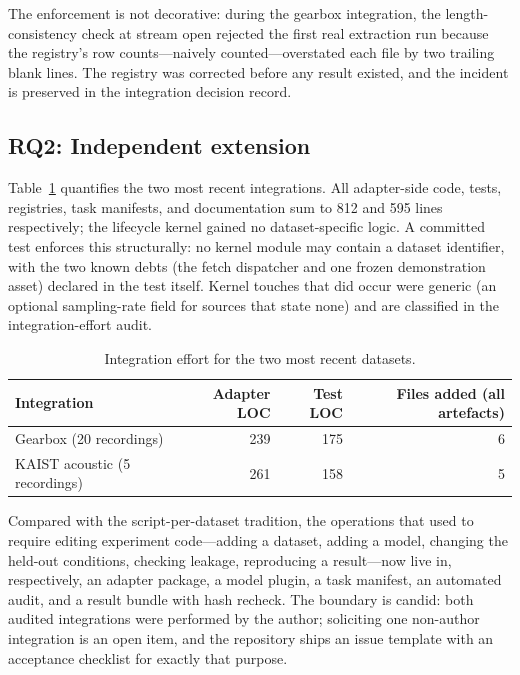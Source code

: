 The enforcement is not decorative: during the gearbox integration, the
length-consistency check at stream open rejected the first real extraction
run because the registry's row counts---naively counted---overstated each
file by two trailing blank lines. The registry was corrected before any
result existed, and the incident is preserved in the integration decision
record.

\subsection{RQ2: Independent extension}

Table~\ref{tab:integration} quantifies the two most recent integrations. All
adapter-side code, tests, registries, task manifests, and documentation sum
to 812 and 595 lines respectively; the lifecycle kernel gained no
dataset-specific logic. A committed test enforces this structurally: no
kernel module may contain a dataset identifier, with the two known debts
(the fetch dispatcher and one frozen demonstration asset) declared in the
test itself. Kernel touches that did occur were generic (an optional
sampling-rate field for sources that state none) and are classified in the
integration-effort audit.

\begin{table}[t]
\centering\small
\caption{Integration effort for the two most recent datasets.}
\label{tab:integration}
\begin{tabular}{@{}lrrr@{}}
\toprule
Integration & Adapter LOC & Test LOC & Files added (all artefacts) \\
\midrule
Gearbox (20 recordings) & 239 & 175 & 6 \\
KAIST acoustic (5 recordings) & 261 & 158 & 5 \\
\bottomrule
\end{tabular}
\end{table}

Compared with the script-per-dataset tradition, the operations that used to
require editing experiment code---adding a dataset, adding a model, changing
the held-out conditions, checking leakage, reproducing a result---now live
in, respectively, an adapter package, a model plugin, a task manifest, an
automated audit, and a result bundle with hash recheck. The boundary is
candid: both audited integrations were performed by the author; soliciting
one non-author integration is an open item, and the repository ships an
issue template with an acceptance checklist for exactly that purpose.

